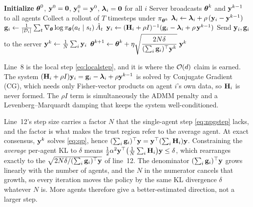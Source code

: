\begin{algorithm}[t]
\caption{FedNPG-ADMM (Algorithm 1 of \citealp{lan2023fednpgadmm})}
\label{alg:fednpgadmm}
\begin{algorithmic}[1]
  \State \textbf{Initialize} $\boldsymbol{\theta}^0$, $\mathbf{y}^0 = \mathbf{0}$,
         $\mathbf{y}_i^0 = \mathbf{y}^0$, $\boldsymbol{\lambda}_i = \mathbf{0}$ for all $i$
    \State Server broadcasts $\boldsymbol{\theta}^k$ and $\mathbf{y}^{k-1}$ to all agents
      \State Collect a rollout of $T$ timesteps under $\pi_{\boldsymbol{\theta}^k}$
      \State $\boldsymbol{\lambda}_i \leftarrow \boldsymbol{\lambda}_i + \rho\,(\mathbf{y}_i - \mathbf{y}^{k-1})$
      \State $\mathbf{g}_i \leftarrow \frac{1}{|\mathcal{D}_i|}\sum_{t}
             \nabla_{\boldsymbol{\theta}}\log\pi_{\boldsymbol{\theta}}(a_t \mid s_t)\,\hat{A}_t$
      \State $\mathbf{y}_i \leftarrow (\mathbf{H}_i + \rho I)^{-1}
             (\mathbf{g}_i - \boldsymbol{\lambda}_i + \rho\,\mathbf{y}^{k-1})$
      \State Send $\mathbf{y}_i, \mathbf{g}_i$ to the server
    \EndFor
    \State $\mathbf{y}^{k} \leftarrow \frac{1}{N}\sum_{i} \mathbf{y}_i$
    \State $\boldsymbol{\theta}^{k+1} \leftarrow \boldsymbol{\theta}^{k} +
           \eta\sqrt{\dfrac{2N\delta}{(\sum_i \mathbf{g}_i)^{\top}\mathbf{y}^{k}}}\;\mathbf{y}^{k}$
  \EndFor
\end{algorithmic}
\end{algorithm}

Line~8 is the local step \eqref{eq:localstep}, and it is where the $\mathcal{O}(d)$
claim is earned. The system $(\mathbf{H}_i + \rho I)\mathbf{y}_i = \mathbf{g}_i - \boldsymbol{\lambda}_i +
\rho\mathbf{y}^{k-1}$ is solved by Conjugate Gradient (CG), which needs only
Fisher-vector products on agent $i$'s own data, so $\mathbf{H}_i$ is never formed.
The $\rho I$ term is simultaneously the ADMM penalty and a
Levenberg--Marquardt damping that keeps the system well-conditioned.

Line~12's step size carries a factor $N$ that the single-agent step
\eqref{eq:npgstep} lacks, and the factor is what makes the trust region refer
to the average agent. At exact consensus, $\mathbf{y}^k$ solves \eqref{eq:qp}, hence
$(\sum_i \mathbf{g}_i)^{\top}\mathbf{y} = \mathbf{y}^{\top}(\sum_i \mathbf{H}_i)\mathbf{y}$. Constraining the
\emph{average} per-agent KL to $\delta$ means
$\tfrac12 \alpha^2 \mathbf{y}^{\top}\big(\tfrac{1}{N}\sum_i\mathbf{H}_i\big)\mathbf{y} \le \delta$,
which rearranges exactly to the $\sqrt{2N\delta/(\sum_i\mathbf{g}_i)^\top\mathbf{y}}$ of
line~12. The denominator $(\sum_i\mathbf{g}_i)^{\top}\mathbf{y}$ grows linearly with the
number of agents, and the $N$ in the numerator cancels that growth, so every
iteration moves the policy by the same KL divergence $\delta$ whatever $N$
is. More agents
therefore give a better-estimated direction, not a larger step.

